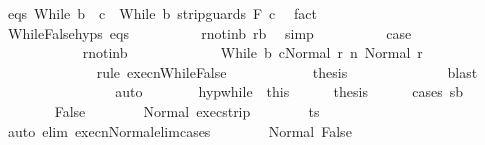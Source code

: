 \begin{isabellebody}
\ eqs{\isacharcolon}\ {\isachardoublequoteopen}While\ b{\isacharprime}\ \ c{\isacharprime}{\isacharprime}\ {\isacharequal}\ While\ b\ {\isacharparenleft}strip{\isacharunderscore}guards\ F\ c{\isacharparenright}{\isachardoublequoteclose}\ \isamarkupfalse%
\ fact\isanewline
\ \ \ \ \ \ \ \ \isamarkupfalse%
\ WhileFalse{\isachardot}hyps\ eqs\isanewline
\ \ \ \ \ \ \ \ \isamarkupfalse%
\ r{\isacharunderscore}not{\isacharunderscore}in{\isacharunderscore}b{\isacharcolon}\ {\isachardoublequoteopen}r{\isasymnotin}b{\isachardoublequoteclose}\ \isamarkupfalse%
\ simp\isanewline
\ \ \ \ \ \ \ \ \isamarkupfalse%
\ {\isacharquery}case\isanewline
\ \ \ \ \ \ \ \ \isamarkupfalse%
\ {\isacharminus}\isanewline
\ \ \ \ \ \ \ \ \ \ \isamarkupfalse%
\ r{\isacharunderscore}not{\isacharunderscore}in{\isacharunderscore}b\ \isanewline
\ \ \ \ \ \ \ \ \ \ \isamarkupfalse%
\ {\isachardoublequoteopen}{\isasymGamma}{\isasymturnstile}{\isasymlangle}While\ b\ c{\isacharcomma}Normal\ r{\isasymrangle}\ {\isacharequal}n{\isasymRightarrow}\ Normal\ r{\isachardoublequoteclose}\isanewline
\ \ \ \ \ \ \ \ \ \ \ \ \isamarkupfalse%
\ {\isacharparenleft}rule\ execn{\isachardot}WhileFalse{\isacharparenright}\isanewline
\ \ \ \ \ \ \ \ \ \ \isamarkupfalse%
\ {\isacharquery}thesis\isanewline
\ \ \ \ \ \ \ \ \ \ \ \ \isamarkupfalse%
\ blast\isanewline
\ \ \ \ \ \ \ \ \isamarkupfalse%
\isanewline
\ \ \ \ \ \ \isamarkupfalse%
\ auto\isanewline
\ \ \ \ \isacommand{{\isacharbraceright}}\isamarkupfalse%
\ \isamarkupfalse%
\ hyp{\isacharunderscore}while\ {\isacharequal}\ this\isanewline
\ \ \ \ \isamarkupfalse%
\ {\isacharquery}thesis\isanewline
\ \ \ \ \isamarkupfalse%
\ {\isacharparenleft}cases\ {\isachardoublequoteopen}s{\isacharprime}{\isasymin}b{\isachardoublequoteclose}{\isacharparenright}\ \isanewline
\ \ \ \ \ \ \isamarkupfalse%
\ False\isanewline
\ \ \ \ \ \ \isamarkupfalse%
\ Normal\ exec{\isacharunderscore}strip\isanewline
\ \ \ \ \ \ \isamarkupfalse%
\ {\isachardoublequoteopen}t{\isacharequal}s{\isachardoublequoteclose}\isanewline
\ \ \ \ \ \ \ \ \isamarkupfalse%
\ {\isacharparenleft}auto\ elim{\isacharcolon}\ execn{\isacharunderscore}Normal{\isacharunderscore}elim{\isacharunderscore}cases{\isacharparenright}\isanewline
\ \ \ \ \ \ \isamarkupfalse%
\ Normal\ False\ \isamarkupfalse%

\end{isabellebody}
